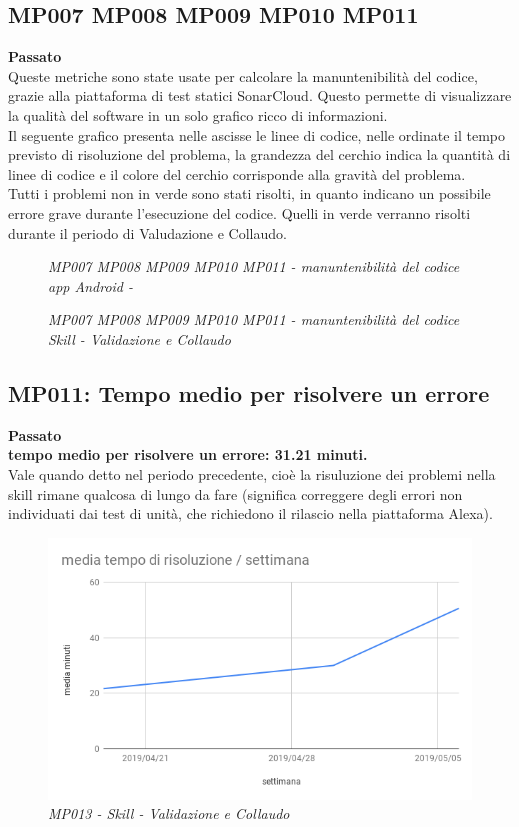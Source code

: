 \subsection{MP007 MP008 MP009 MP010 MP011 }
\textbf{Passato}\\
Queste metriche sono state usate per calcolare la manuntenibilità del codice, grazie alla piattaforma di test statici SonarCloud. Questo permette di visualizzare la qualità del software in un solo grafico ricco di informazioni.\\
Il seguente grafico presenta nelle ascisse le linee di codice, nelle ordinate il tempo previsto di risoluzione del problema, la grandezza del cerchio indica la quantità di linee di codice e il colore del cerchio corrisponde alla gravità del problema.\\
Tutti i problemi non in verde sono stati risolti, in quanto indicano un possibile errore grave durante l'esecuzione del codice. Quelli in verde verranno risolti durante il periodo di Valudazione e Collaudo.\\
\begin{figure} [H]
    \centering

    \caption{\textit{MP007 MP008 MP009 MP010 MP011 - manuntenibilità del codice app Android - }}\label{}
\end{figure}
\begin{figure} [H]
    \centering

    \caption{\textit{MP007 MP008 MP009 MP010 MP011 - manuntenibilità del codice Skill - Validazione e Collaudo}}\label{}
\end{figure}

\subsection{MP011: Tempo medio per risolvere un errore} 
\textbf{Passato}\\
\textbf{tempo medio per risolvere un errore: 31.21 minuti.}\\
Vale quando detto nel periodo precedente, cioè la risuluzione dei problemi nella skill rimane qualcosa di lungo da fare (significa correggere degli errori non individuati dai test di unità, che richiedono il rilascio nella piattaforma Alexa).
\begin{figure} [H]
    \centering
	\includegraphics[scale=0.5]{./images/RA_errori.png}
    \caption{\textit{MP013 - Skill - Validazione e Collaudo}}\label{}
\end{figure}

